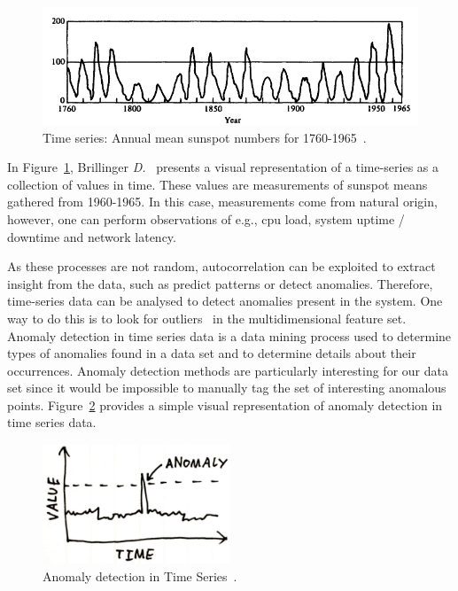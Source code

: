 \begin{figure}[H]
    \centering
    \includegraphics[width=1.00\textwidth]{images/time_series_example.pdf}
    \caption{Time series: Annual mean sunspot numbers for 1760-1965~\cite{Brillinger2006}.}
    \label{fig:time_series_example}
\end{figure}

In Figure~\ref{fig:time_series_example}, Brillinger \textit{D.}~\cite{Brillinger2006} presents a visual representation of a time-series as a collection of values in time. These values are measurements of sunspot means gathered from 1960-1965. In this case, measurements come from natural origin, however, one can perform observations of e.g., \gls{cpu} load, system uptime / downtime and network latency.

As these processes are not random, autocorrelation can be exploited to extract insight from the data, such as predict patterns or detect anomalies. Therefore, time-series data can be analysed to detect anomalies present in the system. One way to do this is to look for outliers~\cite{Liu2004} in the multidimensional feature set. Anomaly detection in time series data is a data mining process used to determine types of anomalies found in a data set and to determine details about their occurrences. Anomaly detection methods are particularly interesting for our data set since it would be impossible to manually tag the set of interesting anomalous points. Figure~\ref{fig:time_series_anomaly_detection_example} provides a simple visual representation of anomaly detection in time series data.

\begin{figure}[H]
    \centering
    \includegraphics[width=0.50\textwidth]{images/time_series_anomaly_detection_example.pdf}
    \caption{Anomaly detection in Time Series~\cite{NikolajBomannMertz}.}
    \label{fig:time_series_anomaly_detection_example}
\end{figure}

